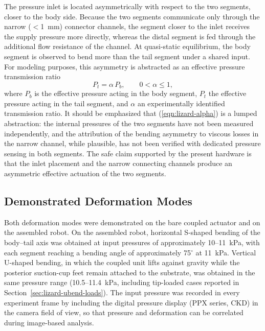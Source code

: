 The pressure inlet is located asymmetrically with respect to the two
segments, closer to the body side. Because the two segments communicate
only through the narrow ($<$1~mm) connector channels, the segment closer
to the inlet receives the supply pressure more directly, whereas the
distal segment is fed through the additional flow resistance of the
channel. At quasi-static equilibrium, the body segment is observed to
bend more than the tail segment under a shared input. For modeling
purposes, this asymmetry is abstracted as an effective pressure
transmission ratio
\begin{equation}
  P_t = \alpha \, P_b, \qquad 0 < \alpha \leq 1,
  \label{eqn:lizard-alpha}
\end{equation}
where $P_b$ is the effective pressure acting in the body segment, $P_t$
the effective pressure acting in the tail segment, and $\alpha$ an
experimentally identified transmission ratio. It should be emphasized
that (\ref{eqn:lizard-alpha}) is a lumped abstraction: the internal
pressures of the two segments have not been measured independently, and
the attribution of the bending asymmetry to viscous losses in the narrow
channel, while plausible, has not been verified with dedicated pressure
sensing in both segments. The safe claim supported by the present
hardware is that the inlet placement and the narrow connecting channels
produce an asymmetric effective actuation of the two segments.

\subsection{Demonstrated Deformation Modes}

Both deformation modes were demonstrated on the bare coupled actuator and
on the assembled robot. On the assembled robot, horizontal S-shaped
bending of the body--tail axis was obtained at input pressures of
approximately 10--11~kPa, with each segment reaching a bending angle of
approximately 75$^{\circ}$ at 11~kPa. Vertical U-shaped bending, in which
the coupled unit lifts against gravity while the posterior suction-cup
feet remain attached to the substrate, was obtained in the same pressure
range (10.5--11.4~kPa, including tip-loaded cases reported in
Section~\ref{sec:lizard-ubend-loads}). The input pressure was recorded in
every experiment frame by including the digital pressure display (PPX
series, CKD) in the camera field of view, so that pressure and
deformation can be correlated during image-based analysis.

